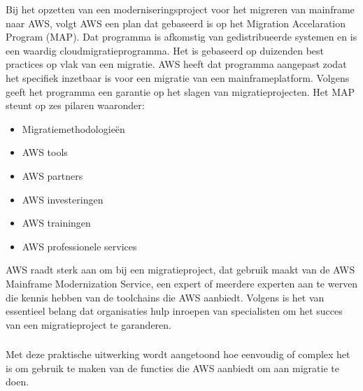 Bij het opzetten van een moderniseringsproject voor het migreren van mainframe naar AWS, volgt AWS een plan dat gebaseerd is op het Migration Accelaration Program (MAP). Dat programma is afkomstig van gedistribueerde systemen en is een waardig cloudmigratieprogramma. Het is gebaseerd op duizenden best practices op vlak van een migratie. AWS heeft dat programma aangepast zodat het specifiek inzetbaar is voor een migratie van een mainframeplatform. Volgens \textcite{Valence2021} geeft het programma een garantie op het slagen van migratieprojecten. Het MAP steunt op zes pilaren waaronder:
 \begin{itemize}
    \item Migratiemethodologieën
    \item AWS tools
    \item AWS partners
    \item AWS investeringen
    \item AWS trainingen
    \item AWS professionele services
\end{itemize}

AWS raadt sterk aan om bij een migratieproject, dat gebruik maakt van de AWS Mainframe Modernization Service, een expert of meerdere experten aan te werven die kennis hebben van de toolchains die AWS aanbiedt. Volgens \textcite{Valence2021} is het van essentieel belang dat organisaties hulp inroepen van specialisten om het succes van een migratieproject te garanderen. 

\subsubsection{}
\label{sec: Een praktische uitwerking: uitvoeren  van COBOL applicatie op AWS Lambda}

Met deze praktische uitwerking wordt aangetoond hoe eenvoudig of complex het is om  gebruik te maken van de functies die AWS aanbiedt om aan migratie te doen.

